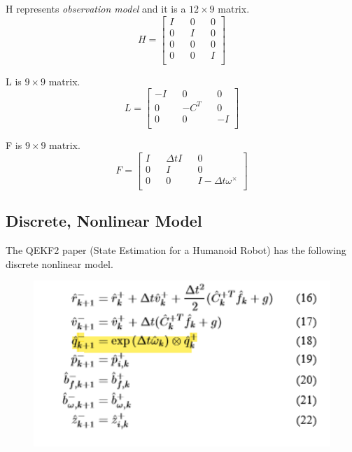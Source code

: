 \documentclass[letterpaper, 10 pt, conference]{ieeeconf}  %
\newcommand{\transpose}[1]{\ensuremath{#1^{\scriptscriptstyle T}}}
\begin{document}
H represents \textit{observation model} and it is a \(12 \times 9\) matrix.
\begin{equation}
H =
\begin{bmatrix}
        I && 0 && 0  \\
        0 && I && 0  \\
        0 && 0 && 0  \\
        0 && 0 && I  \\
\end{bmatrix}
\end{equation}

L is \(9 \times 9\) matrix.
\begin{equation}
L =
\begin{bmatrix}
        -I && 0 && 0  \\
        0 && -\transpose{C} && 0  \\
        0 && 0 && -I  \\
\end{bmatrix}
\end{equation}


F is \(9 \times 9\) matrix.
\begin{equation}
F =
\begin{bmatrix}
        I && \Delta t   I && 0  \\
        0 && I && 0  \\
        0 && 0 && I- \Delta t \omega^{\times}  \\
\end{bmatrix}
\end{equation}

\subsection{Discrete, Nonlinear Model}
The QEKF2 paper (State Estimation for a Humanoid Robot) has the following discrete
nonlinear model.


\begin{figure}[h]
        \includegraphics[width=.45\textwidth]{fig01.png}
        \centering
      \end{figure}
\end{document}
